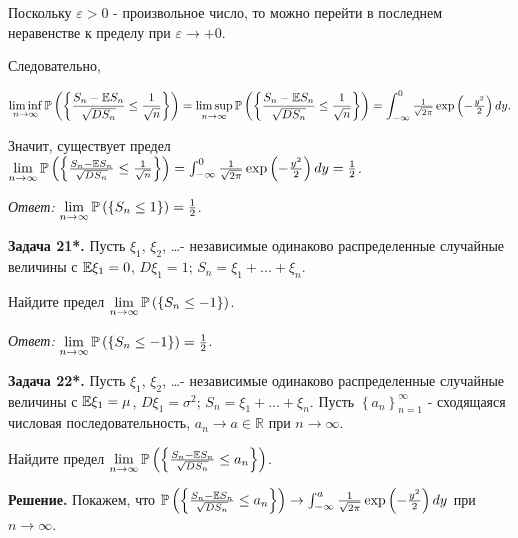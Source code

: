 Поскольку $\varepsilon >0$ - произвольное число, то можно перейти в последнем неравенстве к пределу при $\varepsilon \to +0$.

Следовательно,

\[\mathop{\lim \inf }\limits_{n\to \infty } {\rm {\mathbb P}}\left(\left\{\frac{S_{n} -{\rm {\mathbb E}}S_{n} }{\sqrt{DS_{n} } } \le \frac{1}{\sqrt{n} } \right\}\right)=\mathop{\lim \sup }\limits_{n\to \infty } {\rm {\mathbb P}}\left(\left\{\frac{S_{n} -{\rm {\mathbb E}}S_{n} }{\sqrt{DS_{n} } } \le \frac{1}{\sqrt{n} } \right\}\right)=\int _{-\infty }^{0}{\tfrac{1}{\sqrt{2\pi } }} \exp \left(-{\tfrac{y^{2} }{2}} \right)dy .\] 

Значит, существует предел $\mathop{\lim }\limits_{n\to \infty } {\rm {\mathbb P}}\left(\left\{\frac{S_{n} -{\rm {\mathbb E}}S_{n} }{\sqrt{DS_{n} } } \le \frac{1}{\sqrt{n} } \right\}\right)=\int _{-\infty }^{0}{\tfrac{1}{\sqrt{2\pi } }} \exp \left(-{\tfrac{y^{2} }{2}} \right)dy ={\tfrac{1}{2}} $.

\textit{Ответ:} $\mathop{\lim }\limits_{n\to \infty } {\rm {\mathbb P}}\left(\left\{S_{n} \le 1\right\}\right)={\tfrac{1}{2}} $.

 

\textbf{Задача 21*. }Пусть $\xi _{1} $, $\xi _{2} $, \dots  - независимые одинаково распределенные случайные величины с ${\rm {\mathbb E}}\xi _{1} =0$, $D\xi _{1} =1$; $S_{n} =\xi _{1} +...+\xi _{n} $.  

Найдите предел $\mathop{\lim }\limits_{n\to \infty } {\rm {\mathbb P}}\left(\left\{S_{n} \le -1\right\}\right)$.

\textit{Ответ:} $\mathop{\lim }\limits_{n\to \infty } {\rm {\mathbb P}}\left(\left\{S_{n} \le -1\right\}\right)={\tfrac{1}{2}} $.

 

\textbf{Задача 22*. }Пусть $\xi _{1} $, $\xi _{2} $, \dots  - независимые одинаково распределенные случайные величины с ${\rm {\mathbb E}}\xi _{1} =\mu $, $D\xi _{1} =\sigma ^{2} $; $S_{n} =\xi _{1} +...+\xi _{n} $. Пусть $\left\{a_{n} \right\}_{n=1}^{\infty } $ - сходящаяся числовая последовательность, $a_{n} \to a\in {\mathbb R}$ при $n\to \infty $. 

Найдите предел $\mathop{\lim }\limits_{n\to \infty } {\rm {\mathbb P}}\left(\left\{\frac{S_{n} -{\rm {\mathbb E}}S_{n} }{\sqrt{DS_{n} } } \le a_{n} \right\}\right)$.

\textbf{Решение. }Покажем, что ${\rm {\mathbb P}}\left(\left\{\frac{S_{n} -{\rm {\mathbb E}}S_{n} }{\sqrt{DS_{n} } } \le a_{n} \right\}\right)\to \int _{-\infty }^{a}{\tfrac{1}{\sqrt{2\pi } }} \exp \left(-{\tfrac{y^{2} }{2}} \right)dy $ при $n\to \infty $. 

